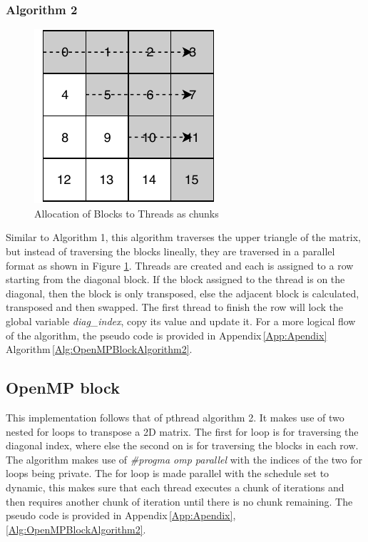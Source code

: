 \documentclass[10pt, onecolumn]{article}
\begin{document}
\subsubsection{Algorithm 2}
%
\begin{figure}[H]
    \centering
    \includegraphics{Documentation/BlockAlgorithm2ThreadAllocation.pdf}
    \caption{Allocation of Blocks to Threads as chunks}
    \label{fig:BlockAlgorithm2ThreadAllocation}
\end{figure}
%
Similar to Algorithm 1, this algorithm traverses the upper triangle of the matrix, but instead of traversing the blocks lineally, they are traversed in a parallel format as shown in Figure \ref{fig:BlockAlgorithm2ThreadAllocation}. Threads are created and each is assigned to a row starting from the diagonal block. If the block assigned to the thread is on the diagonal, then the block is only transposed, else the adjacent block is calculated, transposed and then swapped. The first thread to finish the row will lock the global variable \emph{diag\_index}, copy its value and update it. For a more logical flow of the algorithm, the pseudo code is provided in Appendix\,\ref{App:Apendix} Algorithm\,\ref{Alg:OpenMPBlockAlgorithm2}. 
\subsection{OpenMP block}
%
This implementation follows that of pthread algorithm 2. It makes use of two nested for loops to transpose a 2D matrix. The first for loop is for traversing the diagonal index, where else the second on is for traversing the blocks in each row. The algorithm makes use of \emph{\#progma omp parallel} with the indices of the two for loops being private. The for loop is made parallel with the schedule set to dynamic, this makes sure that each thread executes a chunk of iterations and then requires another chunk of iteration until there is no chunk remaining. The pseudo code is provided in Appendix\,\ref{App:Apendix},\ref{Alg:OpenMPBlockAlgorithm2}.
%
%
\end{document}
